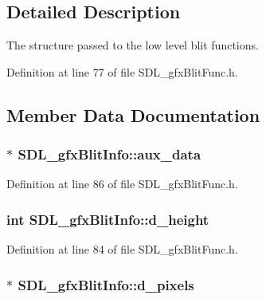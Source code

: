 \subsection{Detailed Description}
The structure passed to the low level blit functions. 

Definition at line 77 of file S\+D\+L\+\_\+gfx\+Blit\+Func.\+h.



\subsection{Member Data Documentation}
\hypertarget{struct_s_d_l__gfx_blit_info_adc4f6e914831474c0f9eb180f32bc8eb}{}
\subsubsection[{aux\+\_\+data}]{$\ast$ S\+D\+L\+\_\+gfx\+Blit\+Info\+::aux\+\_\+data}\label{struct_s_d_l__gfx_blit_info_adc4f6e914831474c0f9eb180f32bc8eb}


Definition at line 86 of file S\+D\+L\+\_\+gfx\+Blit\+Func.\+h.

\hypertarget{struct_s_d_l__gfx_blit_info_aeaf23c44c5c05d890808056c607b1c62}{}
\subsubsection[{d\+\_\+height}]{\setlength{\rightskip}{0pt plus 5cm}int S\+D\+L\+\_\+gfx\+Blit\+Info\+::d\+\_\+height}\label{struct_s_d_l__gfx_blit_info_aeaf23c44c5c05d890808056c607b1c62}


Definition at line 84 of file S\+D\+L\+\_\+gfx\+Blit\+Func.\+h.

\hypertarget{struct_s_d_l__gfx_blit_info_aabdef4377bb5ea77b332f9c450dfc80e}{}
\subsubsection[{d\+\_\+pixels}]{$\ast$ S\+D\+L\+\_\+gfx\+Blit\+Info\+::d\+\_\+pixels}\label{struct_s_d_l__gfx_blit_info_aabdef4377bb5ea77b332f9c450dfc80e}


